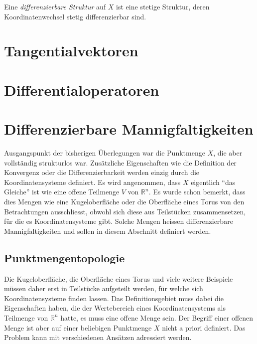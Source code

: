 \begin{definition}
\label{buch:koordinaten:koordinaten:definition:diffbareestruktur}
Eine {\em differenzierbare Struktur} auf $X$ ist eine stetige Struktur,
%
%
deren Koordinatenwechsel stetig differenzierbar sind.
\end{definition}



%
%
\section{Tangentialvektoren
\label{buch:koordinaten:section:tangentialvektoren}}

%
%
\section{Differentialoperatoren
\label{buch:koordinaten:section:differentialoperatoren}}

%
%
\section{Differenzierbare Mannigfaltigkeiten
\label{buch:koordinatne:section:mannigfaltigkeiten}}
Ausgangspunkt der bisherigen Überlegungen war die Punktmenge $X$, die
aber vollständig strukturlos war.
Zusätzliche Eigenschaften wie die Definition der Konvergenz oder
die Differenzierbarkeit werden einzig durch die Koordinatensysteme
definiert.
Es wird angenommen, dass $X$ eigentlich ``das Gleiche'' ist wie eine
offene Teilmenge $V$ von $\mathbb{R}^n$.
Es wurde schon bemerkt, dass dies Mengen wie eine Kugeloberfläche oder
die Oberfläche eines Torus von den Betrachtungen ausschliesst, obwohl
sich diese aus Teilstücken zusammensetzen, für die es Koordinatensysteme
gibt.
Solche Mengen heissen differenzierbare Mannigfaltigkeiten und sollen
in diesem Abschnitt definiert werden.

%
%
\subsection{Punktmengentopologie}
Die Kugeloberfläche, die Oberfläche eines Torus und viele weitere
Beispiele müssen daher erst in Teilstücke aufgeteilt werden, für
welche sich Koordinatensysteme finden lassen.
Das Definitionsgebiet muss dabei die Eigenschaften haben, die der
Wertebereich eines Koordinatensystems als Teilmenge von $\mathbb{R}^n$
hatte, es muss eine offene Menge sein.
Der Begriff einer offenen Menge ist aber auf einer beliebigen Punktmenge
$X$ nicht a priori definiert.
Das Problem kann mit verschiedenen Ansätzen adressiert werden.

